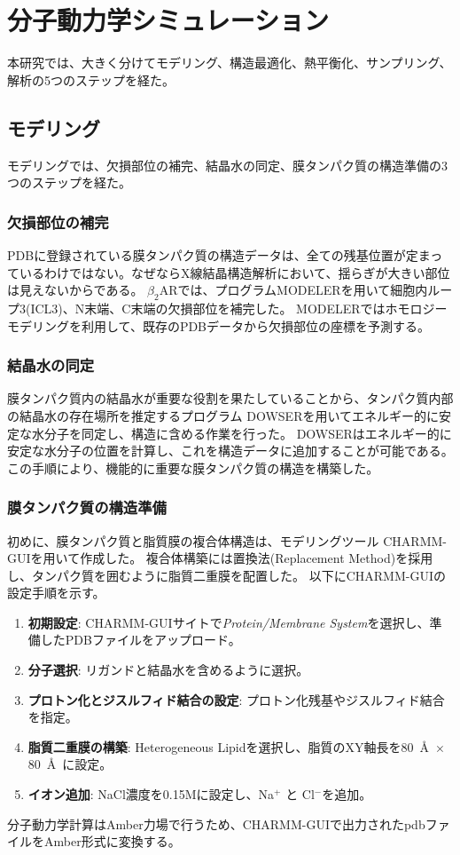 \section{分子動力学シミュレーション}
\label{sec:md}
本研究では、大きく分けてモデリング、構造最適化、熱平衡化、サンプリング、解析の5つのステップを経た。

\subsection{モデリング}
モデリングでは、欠損部位の補完、結晶水の同定、膜タンパク質の構造準備の3つのステップを経た。

\subsubsection{欠損部位の補完}
PDBに登録されている膜タンパク質の構造データは、全ての残基位置が定まっているわけではない。なぜならX線結晶構造解析において、揺らぎが大きい部位は見えないからである。
$\beta_2$ARでは、プログラムMODELER\cite{Sali1995}を用いて細胞内ループ3(ICL3)、N末端、C末端の欠損部位を補完した。
MODELERではホモロジーモデリングを利用して、既存のPDBデータから欠損部位の座標を予測する。

\subsubsection{結晶水の同定}

膜タンパク質内の結晶水が重要な役割を果たしていることから、タンパク質内部の結晶水の存在場所を推定するプログラム DOWSER\cite{Zhang1996}を用いてエネルギー的に安定な水分子を同定し、構造に含める作業を行った。
DOWSERはエネルギー的に安定な水分子の位置を計算し、これを構造データに追加することが可能である。この手順により、機能的に重要な膜タンパク質の構造を構築した。

\subsubsection{膜タンパク質の構造準備}
初めに、膜タンパク質と脂質膜の複合体構造は、モデリングツール CHARMM-GUI\cite{CHARMMGUI}を用いて作成した。
複合体構築には置換法(Replacement Method)を採用し、タンパク質を囲むように脂質二重膜を配置した。
以下にCHARMM-GUIの設定手順を示す。
\begin{enumerate}
    \item \textbf{初期設定}: CHARMM-GUIサイトで\textit{Protein/Membrane System}を選択し、準備したPDBファイルをアップロード。
    \item \textbf{分子選択}: リガンドと結晶水を含めるように選択。
    \item \textbf{プロトン化とジスルフィド結合の設定}: プロトン化残基やジスルフィド結合を指定。
    \item \textbf{脂質二重膜の構築}: Heterogeneous Lipidを選択し、脂質のXY軸長を80~\AA\ $\times$ 80~\AA\ に設定。
    \item \textbf{イオン追加}: NaCl濃度を0.15Mに設定し、Na$^{+}$ と Cl$^{-}$を追加。
\end{enumerate}
分子動力学計算はAmber力場で行うため、CHARMM-GUIで出力されたpdbファイルをAmber形式に変換する。


